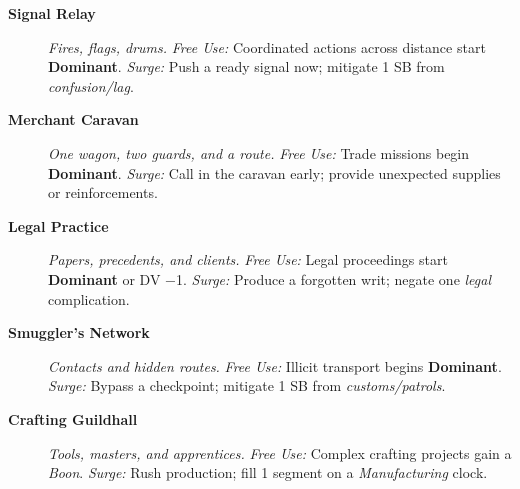 \begin{description}
  \item[\textbf{Signal Relay}]  \emph{Fires, flags, drums.} \emph{Free Use:} Coordinated actions across distance start \textbf{Dominant}. \emph{Surge:} Push a ready signal now; mitigate 1 SB from \emph{confusion/lag}.

  \item[\textbf{Merchant Caravan}]  \emph{One wagon, two guards, and a route.} \emph{Free Use:} Trade missions begin \textbf{Dominant}. \emph{Surge:} Call in the caravan early; provide unexpected supplies or reinforcements.

  \item[\textbf{Legal Practice}]  \emph{Papers, precedents, and clients.} \emph{Free Use:} Legal proceedings start \textbf{Dominant} or DV −1. \emph{Surge:} Produce a forgotten writ; negate one \emph{legal} complication.

  \item[\textbf{Smuggler's Network}]  \emph{Contacts and hidden routes.} \emph{Free Use:} Illicit transport begins \textbf{Dominant}. \emph{Surge:} Bypass a checkpoint; mitigate 1 SB from \emph{customs/patrols}.

  \item[\textbf{Crafting Guildhall}]  \emph{Tools, masters, and apprentices.} \emph{Free Use:} Complex crafting projects gain a \emph{Boon}. \emph{Surge:} Rush production; fill 1 segment on a \emph{Manufacturing} clock.
\end{description}

